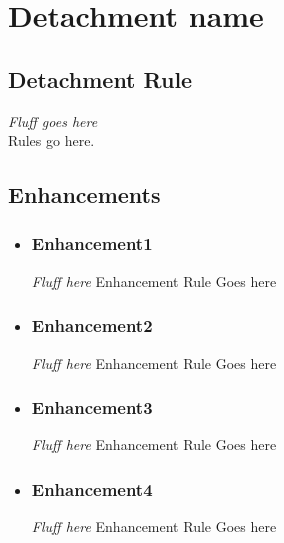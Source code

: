 \documentclass{report}
\begin{document}
\chapter{Detachment name}

\begin{multicols}{2}
\begin{minipage}[t][7cm][b]{\textwidth}
\section{Detachment Rule}\label{sec:rule}%
\textit{Fluff goes here}\\
Rules go here.\\
\section{Enhancements}
\begin{itemize}
\item \subsection{Enhancement1}
\textit{Fluff here}
Enhancement Rule Goes here
\item \subsection{Enhancement2}
\textit{Fluff here}
Enhancement Rule Goes here
\item \subsection{Enhancement3}
\textit{Fluff here}
Enhancement Rule Goes here
\item \subsection{Enhancement4}
\textit{Fluff here}
Enhancement Rule Goes here
\end{itemize}
\end{minipage}
\newpage
\begin{minipage}[t][23cm][b]{\textwidth}

\end{minipage}
\end{multicols}
\end{document}
